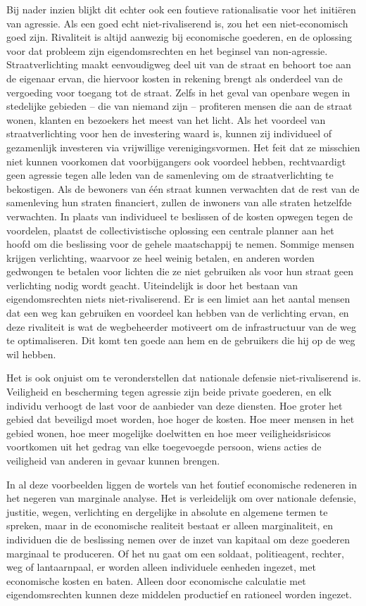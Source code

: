 \documentclass[
  a5paper,
  smalldemyvopaper,11pt,twoside,onecolumn,openright,extrafontsizes,
hidelinks]{memoir}
\begin{document}
Bij nader inzien blijkt dit echter ook een foutieve rationalisatie voor
het initiëren van agressie. Als een goed echt niet-rivaliserend is, zou
het een niet-economisch goed zijn. Rivaliteit is altijd aanwezig bij
economische goederen, en de oplossing voor dat probleem zijn
eigendomsrechten en het beginsel van non-agressie. Straatverlichting
maakt eenvoudigweg deel uit van de straat en behoort toe aan de eigenaar
ervan, die hiervoor kosten in rekening brengt als onderdeel van de
vergoeding voor toegang tot de straat. Zelfs in het geval van openbare
wegen in stedelijke gebieden -- die van niemand zijn -- profiteren
mensen die aan de straat wonen, klanten en bezoekers het meest van het
licht. Als het voordeel van straatverlichting voor hen de investering
waard is, kunnen zij individueel of gezamenlijk investeren via
vrijwillige verenigingsvormen. Het feit dat ze misschien niet kunnen
voorkomen dat voorbijgangers ook voordeel hebben, rechtvaardigt geen
agressie tegen alle leden van de samenleving om de straatverlichting te
bekostigen. Als de bewoners van één straat kunnen verwachten dat de rest
van de samenleving hun straten financiert, zullen de inwoners van alle
straten hetzelfde verwachten. In plaats van individueel te beslissen of
de kosten opwegen tegen de voordelen, plaatst de collectivistische
oplossing een centrale planner aan het hoofd om die beslissing voor de
gehele maatschappij te nemen. Sommige mensen krijgen verlichting,
waarvoor ze heel weinig betalen, en anderen worden gedwongen te betalen
voor lichten die ze niet gebruiken als voor hun straat geen verlichting
nodig wordt geacht. Uiteindelijk is door het bestaan van
eigendomsrechten niets niet-rivaliserend. Er is een limiet aan het
aantal mensen dat een weg kan gebruiken en voordeel kan hebben van de
verlichting ervan, en deze rivaliteit is wat de wegbeheerder motiveert
om de infrastructuur van de weg te optimaliseren. Dit komt ten goede aan
hem en de gebruikers die hij op de weg wil hebben.

Het is ook onjuist om te veronderstellen dat nationale defensie
niet-rivaliserend is. Veiligheid en bescherming tegen agressie zijn
beide private goederen, en elk individu verhoogt de last voor de
aanbieder van deze diensten. Hoe groter het gebied dat beveiligd moet
worden, hoe hoger de kosten. Hoe meer mensen in het gebied wonen, hoe
meer mogelijke doelwitten en hoe meer veiligheidsrisicos voortkomen uit
het gedrag van elke toegevoegde persoon, wiens acties de veiligheid van
anderen in gevaar kunnen brengen.

In al deze voorbeelden liggen de wortels van het foutief economische
redeneren in het negeren van marginale analyse. Het is verleidelijk om
over nationale defensie, justitie, wegen, verlichting en dergelijke in
absolute en algemene termen te spreken, maar in de economische realiteit
bestaat er alleen marginaliteit, en individuen die de beslissing nemen
over de inzet van kapitaal om deze goederen marginaal te produceren. Of
het nu gaat om een soldaat, politieagent, rechter, weg of lantaarnpaal,
er worden alleen individuele eenheden ingezet, met economische kosten en
baten. Alleen door economische calculatie met eigendomsrechten kunnen
deze middelen productief en rationeel worden ingezet.
\end{document}
